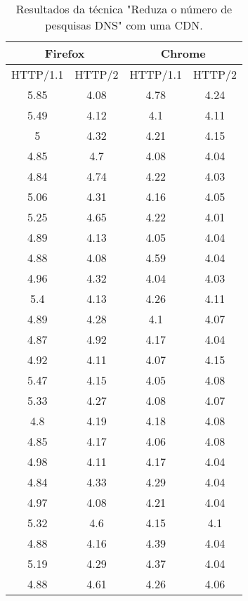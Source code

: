 \begin{table}[H]
	\centering
	\caption{Resultados da técnica "Reduza o número de pesquisas DNS" com uma CDN.}
	\label{resultados-reduzaonumerodepesquisasdns-unica}
	\begin{tabular}{cccc}
		\hline
		\multicolumn{2}{c}{\textbf{Firefox}} & \multicolumn{2}{c}{\textbf{Chrome}} \\
		\hline
		HTTP/1.1 & HTTP/2 & HTTP/1.1 & HTTP/2 \\
		\hline
		5.85 & 4.08 & 4.78 & 4.24 \\
		5.49 & 4.12 & 4.1 & 4.11 \\
		5 & 4.32 & 4.21 & 4.15 \\
		4.85 & 4.7 & 4.08 & 4.04 \\
		4.84 & 4.74 & 4.22 & 4.03 \\
		5.06 & 4.31 & 4.16 & 4.05 \\
		5.25 & 4.65 & 4.22 & 4.01 \\
		4.89 & 4.13 & 4.05 & 4.04 \\
		4.88 & 4.08 & 4.59 & 4.04 \\
		4.96 & 4.32 & 4.04 & 4.03 \\
		5.4 & 4.13 & 4.26 & 4.11 \\
		4.89 & 4.28 & 4.1 & 4.07 \\
		4.87 & 4.92 & 4.17 & 4.04 \\
		4.92 & 4.11 & 4.07 & 4.15 \\
		5.47 & 4.15 & 4.05 & 4.08 \\
		5.33 & 4.27 & 4.08 & 4.07 \\
		4.8 & 4.19 & 4.18 & 4.08 \\ 
		4.85 & 4.17 & 4.06 & 4.08 \\
		4.98 & 4.11 & 4.17 & 4.04 \\
		4.84 & 4.33 & 4.29 & 4.04 \\
		4.97 & 4.08 & 4.21 & 4.04 \\
		5.32 & 4.6 & 4.15 & 4.1 \\
		4.88 & 4.16 & 4.39 & 4.04 \\
		5.19 & 4.29 & 4.37 & 4.04 \\
		4.88 & 4.61 & 4.26 & 4.06 \\
		\hline
	\end{tabular}
\end{table}